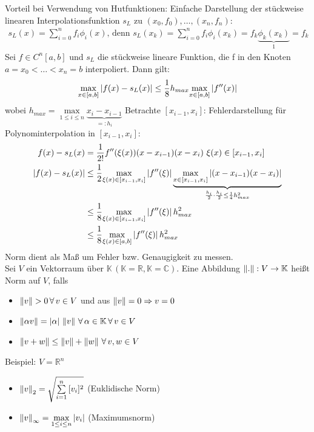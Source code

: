 Vorteil bei Verwendung von Hutfunktionen: Einfache Darstellung der stückweise
linearen Interpolationsfunktion $s_L$ zu $(x_0,f_0),\ldots,(x_n,f_n)$:
\begin{align*}
  s_L(x)=\sum_{i=0}^n f_i \phi_i(x) \text{, denn } s_L(x_k)=\sum_{i=0}^n f_i \phi_i(x_k) = f_k \underbrace{\phi_k(x_k)}_{1} = f_k
\end{align*}
 Sei $f \in C^n[a,b]$ und $s_L$ die stückweise lineare Funktion, die f in den Knoten
$a=x_0<\ldots<x_n=b$ interpoliert. Dann gilt:
\begin{align*}
  \underset{x \in [a, b]}{\max} \left| f(x)-s_L(x) \right| \leq \frac{1}{8}h_{max} \underset{x \in [a, b]}{\max} \left| f''(x) \right|
\end{align*}
wobei $h_{max} = \underset{1 \leq i \leq n}{\max} \underbrace{x_i - x_{i-1}}_{=:h_i}$
 Betrachte $[x_{i-1},x_i]$:
Fehlerdarstellung für Polynominterpolation in $[x_{i-1},x_i]$:
\begin{align*}
  f(x)-s_L(x) &= \frac{1}{2!} f''(\xi(x))(x-x_{i-1})(x-x_i) \,\, \xi(x) \in [x_{i-1},x_i]\\
  \left| f(x)-s_L(x) \right| &\leq \frac{1}{2} \underset{\xi(x) \in [x_{i-1},x_i]}{\max}\left| f''(\xi) \right| 
  \underbrace{\underset{x \in [x_{i-1},x_i]}{\max}\left| (x-x_{i-1})(x-x_i) \right|}_{\frac{h_i}{2}\cdot\frac{h_i}{2}\leq\frac{1}{4}h_{max}^2}\\
  &\leq \frac{1}{8} \underset{\xi(x) \in [x_{i-1},x_i]}{\max}\left| f''(\xi) \right| h_{max}^2\\
  &\leq \frac{1}{8} \underset{\xi(x) \in [a,b]}{\max}\left| f''(\xi) \right| h_{max}^2\\
\end{align*}
Norm dient als Maß um Fehler bzw. Genaugigkeit zu messen.\\
 Sei $V$ ein Vektorraum über $\mathbb{K}\,(\mathbb{K}=\mathbb{R}, \mathbb{K}=\mathbb{C})$.
Eine Abbildung $\left\lVert . \right\rVert: V\rightarrow\mathbb{K}$ heißt Norm auf $V$, falls
\begin{itemize}
  \item $\left\lVert v \right\rVert>0\, \forall\, v \in V$ und aus $\left\lVert v \right\rVert=0 \Rightarrow v = 0$
  \item $\left\lVert \alpha v \right\rVert = \left| \alpha \right|\,\left\lVert v \right\rVert\, \forall\, \alpha \in \mathbb{K}\, \forall\, v \in V$
  \item $\left\lVert v+w \right\rVert \leq \left\lVert v \right\rVert + \left\lVert w \right\rVert\, \forall\,v,w\in V$
\end{itemize}
Beispiel: $V=\mathbb{R}^n$\\
\begin{itemize}
  \item $\left\lVert v \right\rVert_2 = \sqrt{\sum\limits_{i=1}^{n}{[v_i]^2}}$ (Euklidische Norm)
  \item $\left\lVert v \right\rVert_{\infty} = \underset{1 \leq i \leq n}{\max} \left| v_i \right|$ (Maximumsnorm)
\end{itemize}
